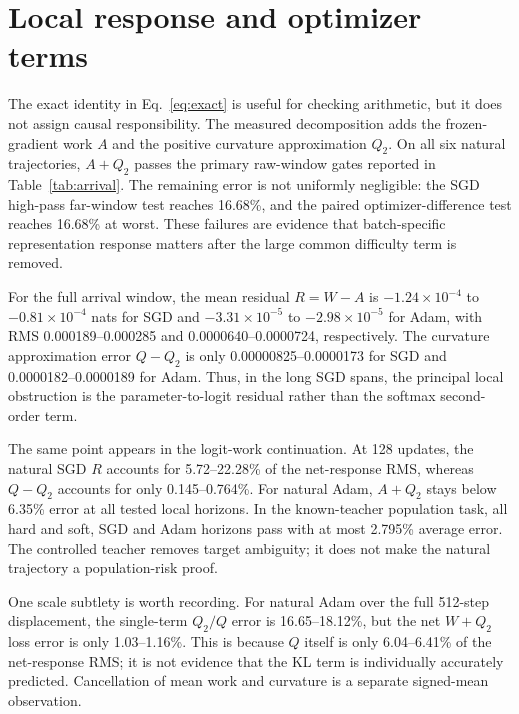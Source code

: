 \section{Local response and optimizer terms}

The exact identity in Eq.~\eqref{eq:exact} is useful for checking arithmetic, but it does not assign causal responsibility.  The measured decomposition adds the frozen-gradient work \(A\) and the positive curvature approximation \(Q_2\).  On all six natural trajectories, \(A+Q_2\) passes the primary raw-window gates reported in Table~\ref{tab:arrival}.  The remaining error is not uniformly negligible: the SGD high-pass far-window test reaches 16.68\%, and the paired optimizer-difference test reaches 16.68\% at worst.  These failures are evidence that batch-specific representation response matters after the large common difficulty term is removed.

For the full arrival window, the mean residual \(R=W-A\) is \(-1.24\times10^{-4}\) to \(-0.81\times10^{-4}\) nats for SGD and \(-3.31\times10^{-5}\) to \(-2.98\times10^{-5}\) for Adam, with RMS 0.000189--0.000285 and 0.0000640--0.0000724, respectively.  The curvature approximation error \(Q-Q_2\) is only 0.00000825--0.0000173 for SGD and 0.0000182--0.0000189 for Adam.  Thus, in the long SGD spans, the principal local obstruction is the parameter-to-logit residual rather than the softmax second-order term.

The same point appears in the logit-work continuation.  At 128 updates, the natural SGD \(R\) accounts for 5.72--22.28\% of the net-response RMS, whereas \(Q-Q_2\) accounts for only 0.145--0.764\%.  For natural Adam, \(A+Q_2\) stays below 6.35\% error at all tested local horizons.  In the known-teacher population task, all hard and soft, SGD and Adam horizons pass with at most 2.795\% average error.  The controlled teacher removes target ambiguity; it does not make the natural trajectory a population-risk proof.

One scale subtlety is worth recording.  For natural Adam over the full 512-step displacement, the single-term \(Q_2/Q\) error is 16.65--18.12\%, but the net \(W+Q_2\) loss error is only 1.03--1.16\%.  This is because \(Q\) itself is only 6.04--6.41\% of the net-response RMS; it is not evidence that the KL term is individually accurately predicted.  Cancellation of mean work and curvature is a separate signed-mean observation.
